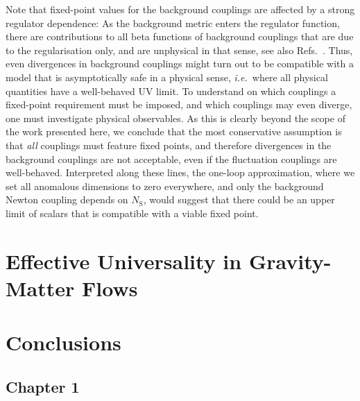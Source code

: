 \documentclass[11pt]{book} %
\newcommand\NS{ N_{\scriptscriptstyle{\mathrm{S}}} }
\newcommand\ie{\textit{i.e.}\ }
\numberwithin{equation}{chapter}
\begin{document}
Note that fixed-point values for the background couplings are affected by a strong regulator dependence:
As the background metric enters the regulator function,
there are contributions to all beta functions of background couplings that are due to the regularisation only,
and are unphysical in that sense, see also
Refs.~\cite{Folkerts:2011jz, Litim:2002ce, Litim:2002hj, Bridle:2013sra}.
Thus, even divergences in background couplings might turn out to be compatible with a model that
is asymptotically safe in a physical sense, \ie where all physical quantities have a well-behaved UV limit.
To understand on which couplings a fixed-point requirement must be imposed,
and which couplings may even diverge, one must investigate physical observables.
As this is clearly beyond the scope of the work presented here, we conclude that the most conservative
assumption is that \emph{all} couplings must feature fixed points,
and therefore divergences in the background couplings are not acceptable,
even if the fluctuation couplings are well-behaved. Interpreted along these lines,
the one-loop approximation, where we set all anomalous dimensions to zero everywhere,
and only the background Newton coupling depends on $\NS$,
would suggest that there could be an upper limit of scalars that is compatible with a viable fixed point.




\chapter{Effective Universality in Gravity-Matter Flows}
\label{ch:jan}




\chapter*{Conclusions}

\section*{Chapter 1}
\end{document}
